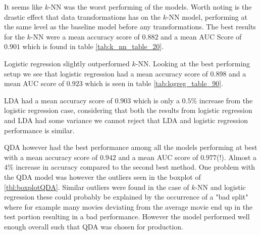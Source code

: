 \documentclass[../../project.tex]{subfiles}
\begin{document}
	It seems like $k$-NN was the worst performing of the models. Worth noting is the drastic effect that data transformations has on the $k$-NN model, performing at the same level as the baseline model before any transformations. The best results for the $k$-NN were a mean accuracy score of $0.882$ and a mean AUC Score of $0.901$ which is found in table \ref{tab:k_nn_table_20}.
	
	Logistic regression slightly outperformed $k$-NN. Looking at the best performing setup we see that logistic regression had a mean accuracy score of $0.898$ and a mean AUC score of $0.923$ which is seen in table \ref{tab:logreg_table_90}.  
	
	LDA had a mean accuracy score of $0.903$ which is only a $0.5\%$ increase from the logistic regression case, considering that both the results from logistic regression and LDA had some variance we cannot reject that LDA and logistic regression performance is similar.
	
	QDA however had the best performance among all the models performing at best with a mean accuracy score of $0.942$ and a mean AUC score of $0.977$(!). Almost a $4\%$ increase in accuracy compared to the second best method. One problem with the QDA model was however the outliers seen in the boxplot of \ref{tbl:boxplotQDA}. Similar outliers were found in the case of $k$-NN and logistic regression these could probably be explained by the occurrence of a "bad split" where for example many movies deviating from the average movie end up in the test portion resulting in a bad performance. However the model performed well enough overall such that QDA was chosen for production.
	
\end{document}
